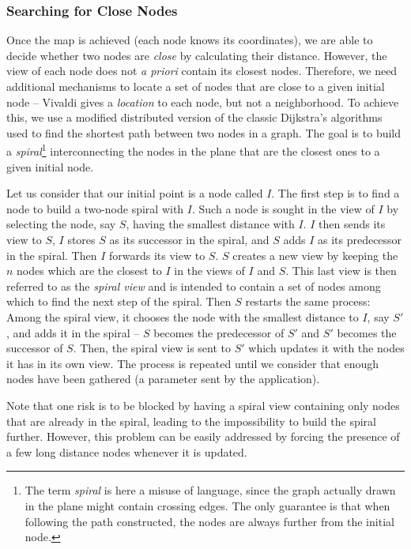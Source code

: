 \vspace*{-.4cm}
\subsubsection*{Searching for Close Nodes}
\vspace*{-.2cm}

Once the map is achieved (each node knows its coordinates), we are able to decide
whether two nodes are \emph{close} by calculating their distance. However, the view of
each node does not \emph{a priori} contain its closest nodes. Therefore, we need additional
mechanisms to locate a set of nodes that are close to a given initial node --
Vivaldi gives a \emph{location} to each node, but not a neighborhood. To achieve
this, we use a modified distributed version of the classic Dijkstra's algorithms
used to find the shortest path between two nodes in a graph. The goal is to
build a \emph{spiral}\footnote{The term \emph{spiral} is here a misuse of
language, since the graph actually drawn in the plane
might contain crossing edges. The only guarantee is that when following the
path constructed, the nodes are always further from the initial node.}
interconnecting the nodes in the plane that are the closest ones to a given initial
node.

Let us consider that our initial point is a node called $I$. The first step is
to find a node to build a two-node spiral with $I$. Such a node is sought in the
view of $I$ by selecting the node, say $S$, having the smallest distance with
$I$. $I$ then sends its view to $S$, $I$ stores $S$ as its successor in the
spiral, and $S$ adds $I$ as its predecessor in the spiral. Then $I$ forwards its
view to $S$. $S$ creates a new view by keeping the $n$ nodes which are the
closest to $I$ in the views of $I$ and $S$. This last view is then referred to
as the \emph{spiral view} and is intended to contain a set of nodes among which
to find the next step of the spiral. Then $S$ restarts the same process: Among
the spiral view, it chooses the node with the smallest distance to $I$, say
$S'$, and adds it in the spiral -- $S$ becomes the predecessor of $S'$ and $S'$
becomes the successor of $S$. Then, the spiral view is sent to $S'$ which
updates it with the nodes it has in its own view. The process is repeated until
we consider that enough nodes have been gathered (a parameter sent by the
application).

Note that one risk is to be blocked by having a spiral view containing only
nodes that are already in the spiral, leading to the impossibility to build the
spiral further. However, this problem can be easily addressed by forcing the
presence of a few long distance nodes whenever it is updated.

